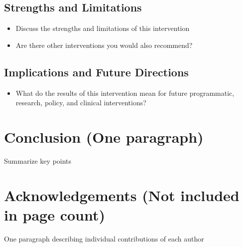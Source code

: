 \documentclass[12pt, letterpaper, draft]{article}
\begin{document}
\subsection{Strengths and Limitations}
\begin{itemize}
    \item Discuss the strengths and limitations of this intervention
    \item Are there other interventions you would also recommend?
\end{itemize}
\subsection{Implications and Future Directions}
\begin{itemize}
    \item What do the results of this intervention mean for future programmatic,
    research, policy, and clinical interventions?
\end{itemize}

\section{Conclusion (One paragraph)}
Summarize key points

\section{Acknowledgements (Not included in page count)}
One paragraph describing individual contributions of each author




\end{document}
